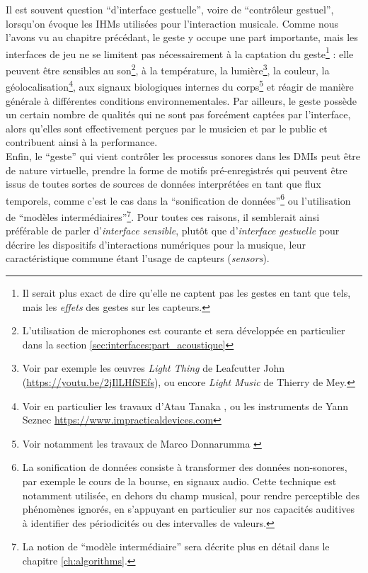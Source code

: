 \noindent Il est souvent question ``d'interface gestuelle'', voire de ``contrôleur gestuel'', lorsqu'on évoque les \glspl{IHM} utilisées pour l'interaction musicale. Comme nous l'avons vu au chapitre précédant, le geste y occupe une part importante, mais les interfaces de jeu ne 
se limitent pas nécessairement à la captation du geste\footnote{Il serait plus exact de dire qu'elle ne captent pas les gestes en tant que tels, mais les \textit{effets} des gestes sur les capteurs.} : elle peuvent être sensibles au son\footnote{L'utilisation de microphones est courante et sera développée en particulier dans la section \ref{sec:interfaces:part_acoustique}}, à la température, la lumière\footnote{Voir par exemple les œuvres \textit{Light Thing} de Leafcutter John (\url{https://youtu.be/2jIlLHfSEfs}), ou encore \textit{Light Music} de Thierry de Mey.}, la couleur, la géolocalisation\footnote{Voir en particulier les travaux d'Atau Tanaka \cite{tanaka_mobile_2004}, ou les instruments de Yann Seznec \url{https://www.impracticaldevices.com}}, aux signaux biologiques internes du corps\footnote{Voir notamment les travaux de Marco Donnarumma \cite{donnarumma_biophysical_2017}} et réagir de manière générale à différentes conditions environnementales. Par ailleurs, le geste possède un certain nombre de qualités qui ne sont pas forcément captées par l'interface, alors qu'elles sont effectivement perçues par le musicien et par le public et contribuent ainsi à la performance.\\
\indent Enfin, le ``geste'' qui vient contrôler les processus sonores dans les \glspl{DMI} peut être de nature virtuelle, prendre la forme de motifs pré-enregistrés qui peuvent être issus de toutes sortes de sources de données interprétées en tant que flux temporels, comme c'est le cas dans la ``sonification de données''\footnote{La sonification de données consiste à transformer des données non-sonores, par exemple le cours de la bourse, en signaux audio. Cette technique est notamment utilisée, en dehors du champ musical, pour rendre perceptible des phénomènes ignorés, en s'appuyant en particulier sur nos capacités auditives à identifier des périodicités ou des intervalles de valeurs.} ou l'utilisation de ``modèles intermédiaires''\footnote{La notion de ``modèle intermédiaire'' sera décrite plus en détail dans le chapitre \ref{ch:algorithms}.}. Pour toutes ces raisons, il semblerait ainsi préférable de parler d'\textit{interface sensible}, plutôt que d'\textit{interface gestuelle} pour décrire les dispositifs d'interactions numériques pour la musique, leur caractéristique commune étant l'usage de capteurs (\textit{sensors}).\\
